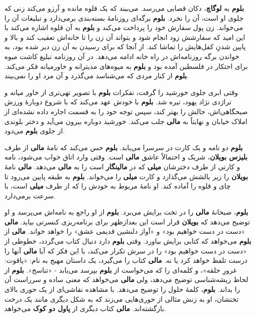 \documentclass[12pt]{book}
\newcommand{\noun}[1]{{\textbf{#1}}}
\begin{document}
    \noun{بلوم} به \noun{لوگاچ}، دکان قصابی می‌رسد. می‌بیند که یک قلوه مانده و آرزو می‌کند زنی که جلوی او است، آن را نخرد. \noun{بلوم} برگه‌ای روزنامهٔ بسته‌بندی برمی‌دارد و تبلیغات آن را می‌خواند. زن پول سفارش خود را پرداخت می‌کند و \noun{بلوم} به آن قلوه اشاره می‌کند با این امید که سفارشش زود انجام شود و بتواند آن زن را تا خانه‌اش تعقیب کند و بالا و پایین شدنِ کفل‌هایش را تماشا کند. از آنجا که برای رسیدن به آن زن دیر شده بود، به خواندن برگه روزنامه‌اش در راه خانه ادامه می‌دهد. در آن روزنامه تبلیغ کاشت میوه برای احتکار در فلسطین آمده بود و \noun{بلوم} به میوه‌های مدیترانه و خاورمیانه فکر می‌کند. \noun{بلوم} از کنار مردی که می‌شناسد می‌گذرد و آن مرد او را نمی‌بیند.

    وقتی ابری جلوی خورشید را گرفت، تفکرات \noun{بلوم} با تصویر تهی‌تری از خاور میانه و تراژدی نژاد یهود، تیره شد. \noun{بلوم} با خودش عهد می‌کند که با شروع دوبارهٔ ورزش صبحگاهی‌اش، حالش را بهتر کند، سپس توجه خود را به قسمت اجاره داده نشده‌ای از املاک خیابان و نهایتاً به \noun{مالی} جلب می‌کند. خورشید دوباره بیرون می‌آید و دختر بلوندی از جلوی \noun{بلوم} می‌دود.

    \noun{بلوم} دو نامه و یک کارت در سرسرا می‌یابد. \noun{بلوم} حس می‌کند که نامهٔ \noun{مالی} از طرف \noun{بلیزس بویلان‬}، شریک و احتمالاً عاشق \noun{مالی} است. وقتی وارد اتاق خواب می‌شود، نامه و کارتی از طرف دخترشان \noun{میلی} که در \noun{مالینگار} است را به \noun{مالی} می‌دهد. \noun{مالی} نامهٔ \noun{بویلان} را زیر بالشش می‌گذارد و کارت \noun{میلی} را می‌خواند. \noun{بلوم} به طبقه پایین می‌رود تا چای و قلوه را آماده کند. او نامهٔ مربوط به خودش را که از طرف \noun{میلی} است، با سرعت برمی‌دارد.

    \noun{بلوم}، صبحانهٔ \noun{مالی} را در تخت برایش می‌برد. \noun{بلوم} از او راجع به نامه‌اش می‌پرسد و او توضیح می‌دهد که \noun{بویلان} قرار است این بعدازظهر برای برنامه‌ریزی کنسرتی بیاید. \noun{مالی} «دست در دست خواهیم بود» و «آواز دلنشین قدیمی عشق» را خواهد خواند. \noun{مالی} از \noun{بلوم} می‌خواهد که کتابی برایش بیاورد. وقتی \noun{بلوم} دارد دنبال کتاب می‌گردد، خطوطی از «دست در دست خواهیم بود» را در سرش تکرار می‌کند، با این فکر که آیا \noun{مالی} آنها را درست تلفظ خواهد کرد یا نه. \noun{مالی} کتاب را می‌گیرد، یک داستان مهیج به نام: «یاقوت: غرورِ حلقه»، و کلمه‌ای را که می‌خواست از \noun{بلوم} بپرسد می‌یابد - «تناسخ». \noun{بلوم} از لحاظ ریشه‌شناسی توضیح می‌دهد، ولی \noun{مالی} می‌خواهد که معنی ساده و سرراست آن را بداند. \noun{بلوم}، کلمهٔ حلول را توضیح می‌دهد. با مشاهده نقاشی‌ای از یک حوری بالای تختشان، او به زنش مثالی از حوری‌هایی می‌زند که به شکل دیگری مانند یک درخت بازگشته‌اند. \noun{مالی} کتاب دیگری از \noun{پاول دو کوک} می‌خواهد.
\end{document}
